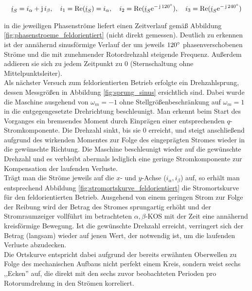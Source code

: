\begin{equation}
    \underline{i}_{S} = i_{\alpha} + \operatorname{j}i_{\beta}, \quad i_1=\operatorname{Re}(\underline{i}_{S})=i_{\alpha}, \quad i_2=\operatorname{Re}(\underline{i}_{S} \mathrm{e}^{-\operatorname{j} 120 \degree}), \quad i_3=\operatorname{Re}(\underline{i}_{S} \mathrm{e}^{-\operatorname{j} 240 \degree})
    \label{eq:umrechnung}
\end{equation}

\noindent in die jeweiligen Phasenströme liefert einen Zeitverlauf gemäß Abbildung \ref{fig:phasenstroeme_feldorientiert} (nicht direkt gemessen). Deutlich zu erkennen ist der annähernd sinusförmige Verlauf der um jeweils $120 \degree$ phasenverschobenen Ströme und die mit zunehmender Rotordrehzahl steigende Frequenz. Außerdem addieren sie sich zu jedem Zeitpunkt zu 0 (Sternschaltung ohne Mittelpunktsleiter).\\ 
\noindent Als nächster Versuch zum feldorientierten Betrieb erfolgte ein Drehzahlsprung, dessen Messgrößen in Abbildung \ref{fig:sprung_sinus} ersichtlich sind. Dabei wurde die Maschine ausgehend von $\omega_m=-1$ ohne Stellgrößenbeschränkung auf $\omega_m=1$ in die entgegengesetzte Drehrichtung beschleunigt. Man erkennt beim Start des Vorganges ein bremsendes Moment durch Einprägen einer entsprechenden $q$-Stromkomponente. Die Drehzahl sinkt, bis sie 0 erreicht, und steigt anschließend aufgrund des wirkenden Momentes zur Folge des eingeprägten Stromes wieder in die gewünschte Richtung. Die Maschine beschleunigt wieder auf die gewünschte Drehzahl und es verbleibt abermals lediglich eine geringe Stromkomponente zur Kompensation der laufenden Verluste.\\ Trägt man die Ströme jeweils auf die $x$- und $y$-Achse ($i_{\alpha}, i_{\beta}$) auf, so erhält man entsprechend Abbildung \ref{fig:stromortskurve_feldorientiert} die Stromortskurve für den feldorientierten Betrieb. Ausgehend von einem geringen Strom zur Folge der Reibung wird der Betrag des Stromes sprungartig erhöht und der Stromraumzeiger vollführt im betrachteten $\alpha,\beta$-KOS mit der Zeit eine annähernd kreisförmige Bewegung. Ist die gewünschte Drehzahl erreicht, verringert sich der Betrag (langsam) wieder auf jenen Wert, der notwendig ist, um die laufenden Verluste abzudecken.\\
Die Ortskurve entspricht dabei aufgrund der bereits erwähnten Oberwellen zu Folge des mechanischen Aufbaus nicht perfekt einem Kreis, sondern weist sechs ,,Ecken'' auf, die direkt mit den sechs zuvor beobachteten Perioden pro Rotorumdrehung in den Strömen korreliert.\\
